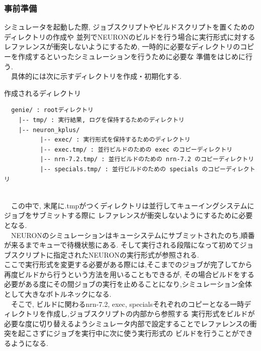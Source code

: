 \subsubsection{事前準備}
シミュレータを起動した際, ジョブスクリプトやビルドスクリプトを置くためのディレクトリの作成や
並列でNEURONのビルドを行う場合に実行形式に対するレファレンスが衝突しないようにするため,
一時的に必要なディレクトリのコピーを作成するといったシミュレーションを行うために必要な
準備をはじめに行う.\\
　具体的には次に示すディレクトリを作成・初期化する.\\
\begin{table}[htb]
  \caption {作成されるディレクトリ}
{\footnotesize
\begin{framed}
\begin{verbatim}
  genie/ : rootディレクトリ
    |-- tmp/ : 実行結果, ログを保持するためのディレクトリ
    |-- neuron_kplus/
          |-- exec/ : 実行形式を保持するためのディレクトリ
          |-- exec.tmp/ : 並行ビルドのための exec のコピーディレクトリ
          |-- nrn-7.2.tmp/ : 並行ビルドのための nrn-7.2 のコピーディレクトリ
          |-- specials.tmp/ : 並行ビルドのための specials のコピーディレクトリ
\end{verbatim}
\end{framed}
}
\end{table}~\\

　この中で, 末尾に.tmpがつくディレクトリは並行してキューイングシステムにジョブをサブミットする際に
レファレンスが衝突しないようにするために必要となる.\\
　NEURONのシミュレーションはキューシステムにサブミットされたのち,順番が来るまでキューで待機状態にある. そして実行される段階になって初めてジョブスクリプトに指定されたNEURONの実行形式が参照される.\\
ここで実行形式を変更する必要がある際には,そこまでのジョブが完了してから再度ビルドから行うという方法を用いることもできるが,
その場合ビルドをする必要がある度にその間ジョブの実行を止めることになり,シミュレーション全体として大きなボトルネックになる.\\
　そこで, ビルドに関わるnrn-7.2, exec, specialsそれぞれのコピーとなる一時ディレクトリを作成し,ジョブスクリプトの内部から参照する
実行形式をビルドが必要な度に切り替えるようシミュレータ内部で設定することでレファレンスの衝突を起こさずにジョブを実行中に次に使う実行形式の
ビルドを行うことができるようになる.\\

